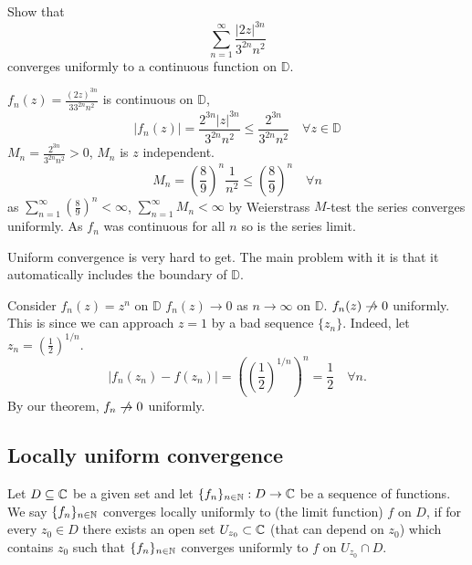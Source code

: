 \documentclass[10pt, a4paper]{article}
\begin{document}
\begin{example}
    Show that
    \[
    \sum_{n = 1}^{\infty}\frac{|2z| ^ {3n}}{3 ^ {2n}n ^ 2}
    \]
    converges uniformly to a continuous function on $\mathbb{D}$.

    \begin{solution}
        $f_n(z) = \frac{(2z) ^ {3n}}{3 3^ {2n}n ^ 2}$ is continuous on $\mathbb{D}$,
        \[
        |f_n(z)| = \frac{2 ^ {3n}|z| ^ {3n}}{3 ^ {2n}n ^ 2} \leq \frac{2 ^ {3n}}{3 ^ {2n}n ^ 2}\quad \forall z \in \mathbb{D}
        \]
        $M_n = \frac{2 ^ {3n}}{3 ^ {2n}n ^ 2} > 0$,
        $M_n$ is $z$ independent.
        \[
        M_n = \left(\frac{8}{9}\right) ^ n\frac{1}{n ^ 2} \leq \left(\frac{8}{9}\right) ^ n\quad \forall n
        \]
        as $\sum_{n = 1}^{\infty}\left(\frac{8}{9}\right) ^ n < \infty$,
        $\sum_{n = 1}^{\infty}M_n < \infty$ by Weierstrass $M$-test the series converges uniformly.
        As $f_n$ was continuous for all $n$ so is the series limit.
    \end{solution}
\end{example}

Uniform convergence is very hard to get.
The main problem with it is that it automatically includes the boundary of $\mathbb{D}$.

Consider $f_n(z) = z ^ n$ on $\mathbb{D}$
$f_n(z) \to 0$ as $n \to \infty$ on $\mathbb{D}$.
$f_n(z) \centernot\to 0$ uniformly.
This is since we can approach $z = 1$ by a bad sequence $\{z_n\}$.
Indeed,
let $z_n = \left(\frac{1}{2}\right) ^ {1 / n}$.
\[
|f_n(z_n) - f(z_n)| = \left(\left(\frac{1}{2}\right) ^ {1 / n}\right) ^ n = \frac{1}{2}\quad \forall n.
\]
By our theorem,
$f_n \centernot\to 0$ uniformly.

\subsection{Locally uniform convergence}

\begin{definition}
    Let $D \subseteq \mathbb{C}$ be a given set and let $\{f_n\}_{n \in \mathbb{N}} : D \to \mathbb{C}$ be a sequence of functions.
    We say $\{f_n\}_{n \in \mathbb{N}}$ converges locally uniformly to
    (the limit function)
    $f$ on $D$,
    if for every $z_0 \in D$ there exists an open set $U_{z_0} \subset \mathbb{C}$
    (that can depend on $z_0$)
    which contains $z_0$ such that $\{f_n\}_{n \in \mathbb{N}}$ converges uniformly to $f$ on $U_{z_0} \cap D$.
\end{definition}
\end{document}

